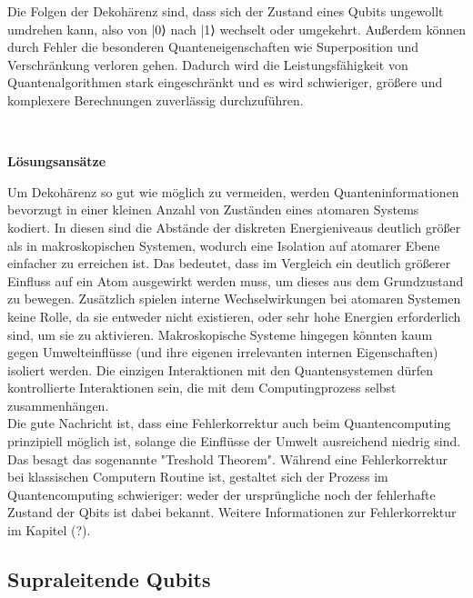 \cite{mermin_quantum_2012}

Die Folgen der Dekohärenz sind, dass sich der Zustand eines Qubits ungewollt umdrehen kann, also von |0⟩ nach |1⟩ wechselt oder umgekehrt. Außerdem können durch Fehler die besonderen Quanteneigenschaften wie Superposition und Verschränkung verloren gehen. Dadurch wird die Leistungsfähigkeit von Quantenalgorithmen stark eingeschränkt und es wird schwieriger, größere und komplexere Berechnungen zuverlässig durchzuführen.

\cite{nielsen_quantum_2010}\\
\cite{fraunhoferiaoQuantumComputingCompact2025}

 
\textbf{Lösungsansätze }

Um Dekohärenz so gut wie möglich zu vermeiden, werden Quanteninformationen bevorzugt in einer kleinen Anzahl von Zuständen eines atomaren Systems kodiert. In diesen sind die Abstände der diskreten Energieniveaus deutlich größer als in makroskopischen Systemen, wodurch eine  Isolation auf atomarer Ebene einfacher zu erreichen ist. Das bedeutet, dass im Vergleich ein deutlich größerer Einfluss auf ein Atom ausgewirkt werden muss, um dieses aus dem Grundzustand zu bewegen. Zusätzlich spielen interne Wechselwirkungen bei atomaren Systemen keine Rolle, da sie entweder nicht existieren, oder sehr hohe Energien erforderlich sind, um sie zu aktivieren.
Makroskopische Systeme hingegen könnten kaum gegen Umwelteinflüsse (und ihre eigenen irrelevanten internen Eigenschaften) isoliert werden. Die einzigen Interaktionen mit den Quantensystemen dürfen kontrollierte Interaktionen sein, die mit dem Computingprozess selbst zusammenhängen. \\

Die gute Nachricht ist, dass eine Fehlerkorrektur auch beim Quantencomputing prinzipiell möglich ist, solange die Einflüsse der Umwelt ausreichend niedrig sind. Das besagt das sogenannte "Treshold Theorem". Während eine Fehlerkorrektur bei klassischen Computern Routine ist, gestaltet sich der Prozess im Quantencomputing schwieriger: weder der ursprüngliche noch der fehlerhafte Zustand der Qbits ist dabei bekannt. 
Weitere Informationen zur Fehlerkorrektur im Kapitel (?). \\
 
\cite{mermin_quantum_2012}

\subsection{Supraleitende Qubits }
\label{subsec: Supraleitende Qubits}

